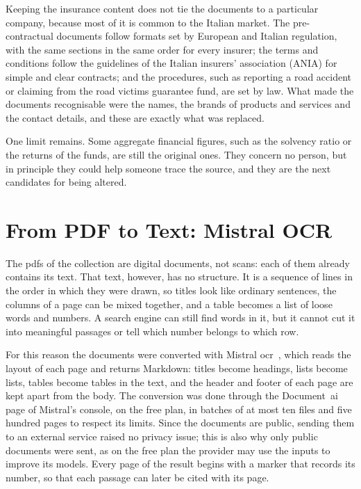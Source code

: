 Keeping the insurance content does not tie the documents to a particular company, because most of
it is common to the Italian market. The pre-contractual documents follow formats set by European
and Italian regulation, with the same sections in the same order for every insurer; the terms and
conditions follow the guidelines of the Italian insurers' association (ANIA) for simple and clear
contracts; and the procedures, such as reporting a road accident or claiming from the road victims
guarantee fund, are set by law. What made the documents recognisable were the names, the brands of
products and services and the contact details, and these are exactly what was replaced.

One limit remains. Some aggregate financial figures, such as the solvency ratio or the returns of
the funds, are still the original ones. They concern no person, but in principle they could help
someone trace the source, and they are the next candidates for being altered.

\section{From PDF to Text: Mistral OCR}
\label{sec:parsing}

The \acsp{pdf} of the collection are digital documents, not scans: each of them already contains its
text. That text, however, has no structure. It is a sequence of lines in the order in which they
were drawn, so titles look like ordinary sentences, the columns of a page can be mixed together,
and a table becomes a list of loose words and numbers. A search engine can still find words in it,
but it cannot cut it into meaningful passages or tell which number belongs to which row.

For this reason the documents were converted with Mistral \ac{ocr}~\cite{mistral2026ocr}, which reads
the layout of each page and returns Markdown: titles become headings, lists
become lists, tables become tables in the text, and the header and footer of each page are kept
apart from the body. The conversion was done through the Document~\ac{ai} page of Mistral's
console, on the free plan, in batches of at most ten files and five hundred pages to respect its
limits. Since the documents are public, sending them to an
external service raised no privacy issue; this is also why only public documents were sent, as on the
free plan the provider may use the inputs to improve its models. Every page of the result
begins with a marker that records its number, so that each passage can later be cited with its
page.

